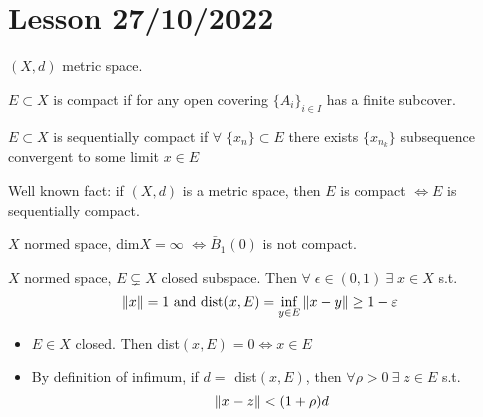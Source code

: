 \section{Lesson 27/10/2022}

\(\left(X, d\right)\) metric space.
\begin{definition}
    \(E \subset X\) is compact if for any open covering \(\{A_i\}_{i \in I}\) has a finite subcover.
\end{definition}

\begin{definition}
    \(E \subset X\) is sequentially compact if \(\forall \; \{x_n\} \subset E \) 
    there exists \(\{x_{n_k}\}\) subsequence convergent to some limit \(x \in E\)
\end{definition}

Well known fact: if \(\left(X, d\right)\) is a metric space, then \(E\) is compact \(\iff E \) is sequentially compact.

\begin{theorem}
    \(X\) normed space, dim\(X = \infty\) \(\iff \bar{B}_1(0)\) is not compact. 
\end{theorem}

\begin{lemma}
    \(X\) normed space, \(E \subsetneq X\) closed subspace. Then \(\forall \; \epsilon \in \left(0, 1\right) \ \exists \; x \in X \) s.t. 
    \[
        \norm{x}=1 \text{ and } \text{dist}(x, E) = \inf_{y \in E} \norm{x-y} \geq 1- \varepsilon\]
\end{lemma}

\begin{remark}

    \begin{itemize}
        \item \(E \in X\) closed. Then dist\((x, E)=0 \iff x \in E\)
        \item By definition of infimum, if \(d =\) dist\((x, E)\), then \(\forall \rho >0 \ \exists \; z \in E\) s.t. 
        \[
            \norm{x-z} < (1+\rho) d
        \]
    \end{itemize}
\end{remark}

